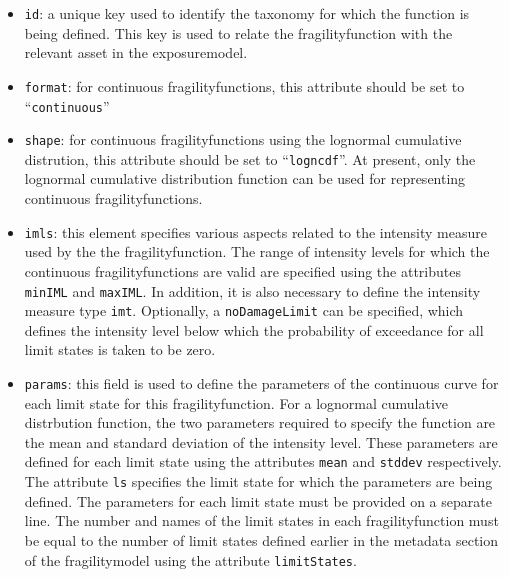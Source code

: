 \begin{itemize}

    \item \Verb+id+: a unique key used to identify the \gls{taxonomy} for 
    which the function is being defined. This key is used to relate the 
    \gls{fragilityfunction} with the relevant \gls{asset} in the 
    \gls{exposuremodel}.

    \item \Verb+format+: for continuous \glspl{fragilityfunction}, this
    attribute should be set to ``\Verb+continuous+''

    \item \Verb+shape+: for continuous \glspl{fragilityfunction} using the lognormal
    cumulative distrution, this attribute should be set to ``\Verb+logncdf+''.
    At present, only the lognormal cumulative distribution function can be 
    used for representing continuous \glspl{fragilityfunction}.

    \item \Verb+imls+: this element specifies various aspects related to the 
    intensity measure used by the the \gls{fragilityfunction}. The range of 
    intensity levels for which the continuous \glspl{fragilityfunction} are valid 
    are specified using the attributes \Verb+minIML+ and \Verb+maxIML+. 
    In addition, it is also necessary to define the intensity measure type 
    \Verb+imt+. Optionally, a \Verb+noDamageLimit+ can be specified, which 
    defines the intensity level below which the probability of exceedance 
    for all limit states is taken to be zero.

    \item \Verb+params+: this field is used to define the parameters of the 
    continuous curve for each limit state for this 
    \gls{fragilityfunction}. For a lognormal cumulative distrbution function, 
    the two parameters required to specify the function are the mean and 
    standard deviation of the intensity level. These parameters are defined for 
    each limit state using the attributes \Verb+mean+ and \Verb+stddev+ 
    respectively. The attribute \Verb+ls+ specifies the limit state for which 
    the parameters are being defined. The parameters for each limit state
    must be provided on a separate line. The number and names of the limit 
    states in each \gls{fragilityfunction} must be equal to the number of limit 
    states defined earlier in the metadata section of the \gls{fragilitymodel}
    using the attribute \Verb+limitStates+.

\end{itemize}


